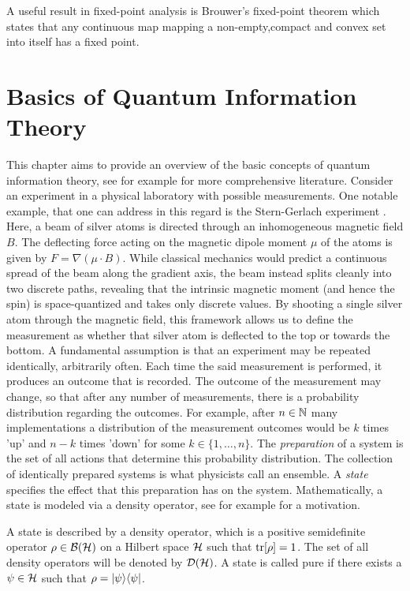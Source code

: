 A useful result in fixed-point analysis is Brouwer's fixed-point theorem which states that any continuous map mapping a non-empty,compact and convex set into itself has a fixed point.


\section{Basics of Quantum Information Theory}


This chapter aims to provide an overview of the basic concepts of quantum information theory, see for example \cite{watrousTheoryQuantumInformation2018} for more comprehensive literature. Consider an experiment in a physical laboratory with possible measurements. One notable example, that one can address in this regard is the Stern-Gerlach experiment \cite{Gerlach}. Here, a beam of silver atoms is directed through an inhomogeneous magnetic field $B$. The deflecting force acting on the magnetic dipole moment $\mu$ of the atoms is given by $F = \nabla({\mu}\cdot {B})$. While classical mechanics would predict a continuous spread of the beam along the gradient axis, the beam instead splits cleanly into two discrete paths, revealing that the intrinsic magnetic moment (and hence the spin) is space-quantized and takes only discrete values. By shooting a single silver atom through the magnetic field, this framework allows us to define the measurement as whether that silver atom is deflected to the top or towards the bottom. A fundamental assumption is that an experiment may be repeated identically, arbitrarily often. Each time the said measurement is performed, it produces an outcome that is recorded. The outcome of the measurement may change, so that after any number of measurements, there is a probability distribution regarding the outcomes. For example, after $n\in\mathbb{N}$ many implementations a distribution of the measurement outcomes would be $k$ times 'up' and $n-k$ times 'down' for some $k\in\{1,\dots, n\}$. The \textit{preparation} of a system is the set of all actions that determine this probability distribution. The collection of identically prepared systems is what physicists call an ensemble. A \textit{state} specifies the effect that this preparation has on the system. Mathematically, a state is modeled via a density operator, see for example \cite{Von_Neumann1996-bt} for a motivation.
\begin{definition} A state is described by a density operator, which is a positive semidefinite operator $\rho \in \mathcal B(\mathcal{H})$ on a Hilbert space $\mathcal{H}$ such that $\mathrm{tr}[\rho] = 1$. The set of all density operators will be denoted by $\mathcal D(\mathcal{H})$. A state is called pure if there exists a $\psi \in \mathcal{H}$ such that $\rho = \lvert\psi\rangle\langle\psi\rvert$.
\end{definition}\noindent
